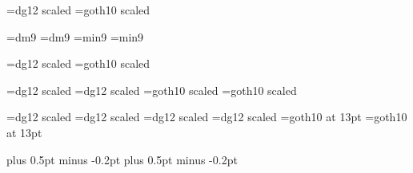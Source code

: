 \ifNTT
\jfont\titledm=dg12 scaled 
\else
\font\titledm=goth10 scaled 
\fi

\ifNTT
\jfont\inddm=dm9
\jfont\inddg=dm9
\else
\font\inddm=min9
\font\inddg=min9
\fi

\ifNTT
\jfont\chapdm=dg12 scaled 
\else
\font\chapdm=goth10 scaled 
\fi
\let\chapdg=\chapdm

\ifNTT
\jfont\secdm=dg12 scaled 
\jfont\secdg=dg12 scaled 
\else
\font\secdm=goth10 scaled 
\font\secdg=goth10 scaled 
\fi

\ifNTT
\ifNTTOLD                       %
\jfont\ssecdm=dg12 scaled {\magstephalf}
\jfont\ssecdg=dg12 scaled {\magstephalf}
\else
\jfont\ssecdm=dg12 scaled \magstephalf
\jfont\ssecdg=dg12 scaled \magstephalf
\fi
\else
\font\ssecdm=goth10 at 13pt
\font\ssecdg=goth10 at 13pt
\fi

\ifNTT
\jintercharskip=0pt plus 0.5pt minus -0.2pt
\jasciikanjiskip=2.28854pt plus 0.5pt minus -0.2pt
\fi

\let\origrm=\rm
\def\rm{\origrm\tendm}
\let\origbf=\bf
\def\bf{\origbf\tendg}
\let\origsl=\sl
\def\sl{\origsl\tendg}
\let\origauthorrm=\authorrm
\def\authorrm{\origauthorrm\secdm}


\let\origtextfonts=\textfonts
\def\textfonts{\let\tendm=\textdm\let\tendg=\textdg\origtextfonts\textrm\textdm
}
\let\origtitlefonts=\titlefonts
\def\titlefonts{\let\tendm=\titledm\let\tendg=\titledg\origtitlefonts}
\let\origchapfonts=\chapfonts
\def\chapfonts{\let\tendm=\chapdm\let\tendg=\chapdg\origchapfonts}
\let\origsecfonts=\secfonts
\def\secfonts{\let\tendm=\secdm\let\tendg=\secdg\origsecfonts}
\let\origsubsecfonts=\subsecfonts
\def\subsecfonts{\let\tendm=\ssecdm\let\tendg=\ssecdg\origsubsecfonts}
\let\origindexfonts=\indexfonts
\def\indexfonts{\let\tendm=\inddm\let\tendg=\inddg\origindexfonts}

\let\origignoremorecommands=\ignoremorecommands
\def\ignoremorecommands{
\origignoremorecommands
\let\result=\relax\let\expansion=\relax\let\print=\relax\let\equiv=\relax
}

